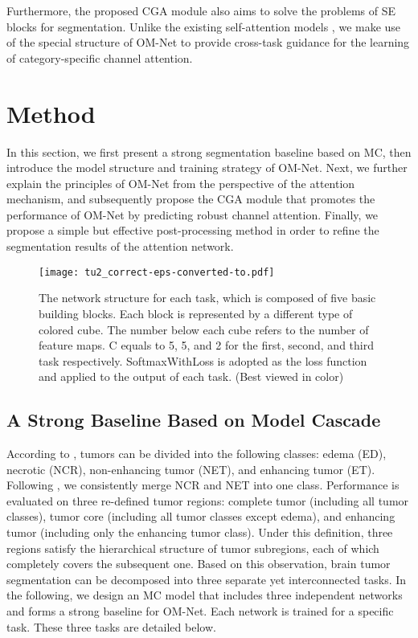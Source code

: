 \documentclass[journal,twoside]{IEEEtran}
\begin{document}
Furthermore, the proposed CGA module also aims to solve the problems of SE blocks for segmentation. Unlike the existing self-attention models \cite{Hu_2018_CVPR,jaderberg2015spatial,li2018harmonious,wang2017residual,roy2018concurrent,pereira2018adaptive,zhu2019attention}, we make use of the special structure of OM-Net to provide cross-task guidance for the learning of category-specific channel attention. 



\section{Method}
In this section, we first present a strong segmentation baseline based on MC, then introduce the model structure and training strategy of OM-Net. Next, we further explain the principles of OM-Net from the perspective of the attention mechanism, and subsequently propose the CGA module that promotes the performance of OM-Net by predicting robust channel attention. Finally, we propose a simple but effective post-processing method in order to refine the segmentation results of the attention network. 



\begin{figure*}
	\centering
	\texttt{[image: tu2\_correct-eps-converted-to.pdf]}	
	\caption{The network structure for each task, which is composed of five basic building blocks. Each block is represented by a different type of colored cube. The number below each cube refers to the number of feature maps. C equals to 5, 5, and 2 for the first, second, and third task respectively. SoftmaxWithLoss is adopted as the loss function and applied to the output of each task. (Best viewed in color)
	}
	\label{Fig.1}
\end{figure*}






\subsection{A Strong Baseline Based on Model Cascade}


According to \cite{menze2015multimodal}, tumors can be divided into the following classes: edema (ED), necrotic (NCR), non-enhancing tumor (NET), and enhancing tumor (ET). Following \cite{brats2018_data}, we consistently merge NCR and NET into one class. Performance is evaluated on three re-defined tumor regions: complete tumor (including all tumor classes), tumor core (including all tumor classes except edema), and enhancing tumor (including only the enhancing tumor class). Under this definition, three regions satisfy the hierarchical structure of tumor subregions, each of which completely covers the subsequent one. Based on this observation, brain tumor segmentation can be decomposed into three separate yet interconnected tasks. In the following, we design an MC model that includes three independent networks and forms a strong baseline for OM-Net. Each network is trained for a specific task. These three tasks are detailed below.
\end{document}
